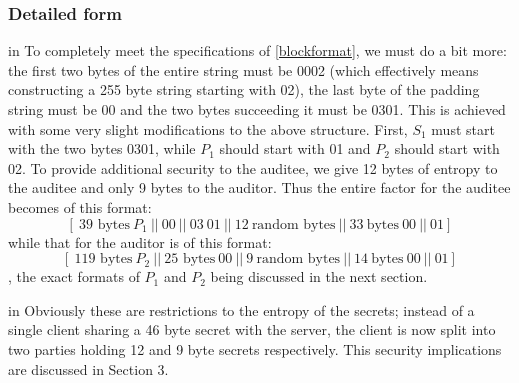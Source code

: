 \documentclass[10pt,a4paper]{article}
\begin{document}
\subsubsection{Detailed form}

 in
\noindent To completely meet the specifications of \eqref{blockformat}, we must do a bit more: the first two bytes of the entire string must be 0002 (which effectively means constructing a 255 byte string starting with 02), the last byte of the padding string must be 00 and the two bytes succeeding it must be 0301. This is achieved with some very slight modifications to the above structure. First, $S_1$ must start with the two bytes 0301, while $P_1$ should start with 01 and $P_2$ should start with 02. To provide additional security to the auditee, we give 12 bytes of entropy to the auditee and only 9 bytes to the auditor. Thus the entire factor for the auditee becomes of this format:
\begin{equation}\label{auditee_factor}
[ \ \textrm{39 bytes}\ P_1\ ||\ 00\ ||\ 03\ 01\ ||\ 12\ \textrm{random bytes}\ ||\ 33\ \textrm{bytes}\ 00\ ||\ 01 ] 
\end{equation}
while that for the auditor is of this format:
\begin{equation}\label{auditor_factor}
[ \ \textrm{119 bytes}\ P_2\ ||\ \textrm{25 bytes}\ 00\ ||\ 9\ \textrm{random bytes}\ ||\ 14\ \textrm{bytes}\ 00\ ||\ 01 ] 
\end{equation}
, the exact formats of $P_1$ and $P_2$ being discussed in the next section.

 in 
\noindent Obviously these are restrictions to the entropy of the secrets; instead of a single client sharing a 46 byte secret with the server, the client is now split into two parties holding 12 and 9 byte secrets respectively. This security implications are discussed in Section 3.  
\end{document}
